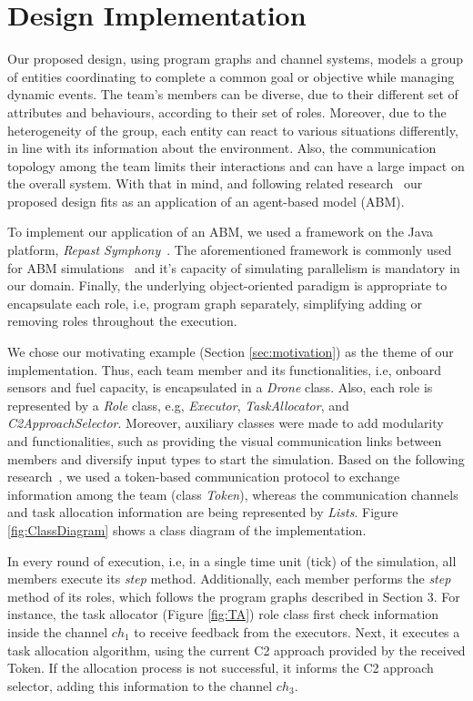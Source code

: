 \newpage
\section{Design Implementation}
\label{sec:design}

Our proposed design, using program graphs and channel systems, models a group of entities coordinating to complete a common goal or objective while managing dynamic events. The team's members can be diverse, due to their different set of attributes and behaviours, according to their set of roles. Moreover, due to the heterogeneity of the group, each entity can react to various situations differently, in line with its information about the environment. Also, the communication topology among the team limits their interactions and can have a large impact on the overall system. With that in mind, and following related research~\cite{evaluating} our proposed design fits as an application of an agent-based model (ABM). 

To implement our application of an ABM, we used a framework on the Java platform, \textit{Repast Symphony}~\cite{repastDoc}. The aforementioned framework is commonly used for ABM simulations~\cite{repast} and it's capacity of simulating parallelism is mandatory in our domain. Finally, the underlying object-oriented paradigm is appropriate to encapsulate each role, i.e, program graph separately, simplifying adding or removing roles throughout the execution.

We chose our motivating example (Section \ref{sec:motivation}) as the theme of our implementation. Thus, each team member and its functionalities, i.e, onboard sensors and fuel capacity, is encapsulated in a \textit{Drone} class. Also, each role is represented by a \textit{Role} class, e.g, \textit{Executor}, \textit{TaskAllocator}, and \textit{C2ApproachSelector}. Moreover, auxiliary classes were made to add modularity and functionalities, such as providing the visual communication links between members and diversify input types to start the simulation. Based on the following research~\cite{swarmGap}, we used a token-based communication protocol to exchange information among the team (class \textit{Token}), whereas the communication channels and task allocation information are being represented by \textit{Lists}. Figure \ref{fig:ClassDiagram} shows a class diagram of the implementation.

In every round of execution, i.e, in a single time unit (tick) of the simulation, all members execute its \textit{step} method. Additionally, each member performs the \textit{step} method of its roles, which follows the program graphs described in Section 3. For instance, the task allocator (Figure \ref{fig:TA}) role class first check information inside the channel $ch_1$ to receive feedback from the executors. Next, it executes a task allocation algorithm, using the current C2 approach provided by the received Token. If the allocation process is not successful, it informs the C2 approach selector, adding this information to the channel $ch_3$.

